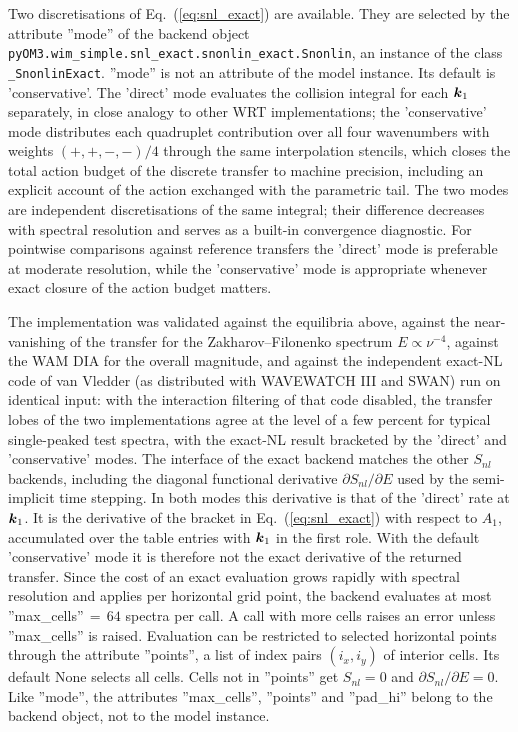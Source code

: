 \documentclass[12pt]{article}
\newcommand{\eq }  [1]{Eq.~(\ref{#1})}  %
\renewcommand{\v}[1]{{\mbox{\boldmath$ #1 $}}}  %
\newcommand{\p}{{\partial}}
\begin{document}
Two discretisations of \eq{eq:snl_exact} are available.
They are selected by the attribute ''mode'' of the backend object
\verb|pyOM3.wim_simple.snl_exact.snonlin_exact.Snonlin|, an instance of the
class \verb|_SnonlinExact|.
''mode'' is not an attribute of the model instance.
Its default is 'conservative'.
The 'direct' mode evaluates the collision integral for each $\v k_1$
separately, in close analogy to other WRT implementations; the 'conservative'
mode distributes each quadruplet contribution over all four wavenumbers with
weights $(+,+,-,-)/4$ through the same interpolation stencils, which closes
the total action budget of the discrete transfer to machine precision,
including an explicit account of the action exchanged with the parametric
tail.
The two modes are independent discretisations of the same integral; their
difference decreases with spectral resolution and serves as a built-in
convergence diagnostic.
For pointwise comparisons against reference transfers the 'direct' mode is
preferable at moderate resolution, while the 'conservative' mode is
appropriate whenever exact closure of the action budget matters.

The implementation was validated against the equilibria above, against the
near-vanishing of the transfer for the Zakharov--Filonenko spectrum
$E \propto \nu^{-4}$, against the WAM DIA for the overall magnitude, and
against the independent exact-NL code of van Vledder (as distributed with
WAVEWATCH III and SWAN) run on identical input: with the interaction filtering
of that code disabled, the transfer lobes of the two implementations agree at
the level of a few percent for typical single-peaked test spectra, with the
exact-NL result bracketed by the 'direct' and 'conservative' modes.
The interface of the exact backend matches the other $S_{nl}$ backends,
including the diagonal functional derivative $\p S_{nl}/\p E$ used by the
semi-implicit time stepping.
In both modes this derivative is that of the 'direct' rate at $\v k_1$.
It is the derivative of the bracket in \eq{eq:snl_exact} with respect to $A_1$,
accumulated over the table entries with $\v k_1$ in the first role.
With the default 'conservative' mode it is therefore not the exact derivative
of the returned transfer.
Since the cost of an exact evaluation grows rapidly with spectral resolution
and applies per horizontal grid point, the backend evaluates at most
''max\_cells''$\,=\,64$ spectra per call.
A call with more cells raises an error unless ''max\_cells'' is raised.
Evaluation can be restricted to selected horizontal points through the
attribute ''points'', a list of index pairs $(i_x, i_y)$ of interior cells.
Its default None selects all cells.
Cells not in ''points'' get $S_{nl} = 0$ and $\p S_{nl}/\p E = 0$.
Like ''mode'', the attributes ''max\_cells'', ''points'' and ''pad\_hi'' belong
to the backend object, not to the model instance.
\end{document}
